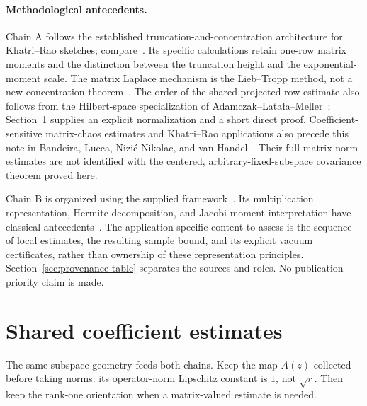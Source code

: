 \documentclass[11pt]{article}
\numberwithin{equation}{section}
\theoremstyle{definition}\newtheorem{definition}[theorem]{Definition}
\theoremstyle{remark}\newtheorem{remark}[theorem]{Remark}
\begin{document}
\paragraph{Methodological antecedents.}
Chain A follows the established truncation-and-concentration architecture for
Khatri--Rao sketches; compare~\cite[Section~2.3]{BM}. Its specific calculations
retain one-row matrix moments and the distinction between the truncation height
and the exponential-moment scale. The matrix Laplace mechanism is the
Lieb--Tropp method, not a new concentration theorem~\cite{Lieb,Tropp}.
The order of the shared projected-row estimate also follows from the Hilbert-space
specialization of Adamczak--Lata\l a--Meller~\cite[Corollary~12]{ALM};
Section~\ref{sec:common} supplies an explicit normalization and a short direct proof.
Coefficient-sensitive matrix-chaos estimates and Khatri--Rao applications also
precede this note in Bandeira, Lucca, Nizi\'c-Nikolac, and
van Handel~\cite{BLNvH}. Their full-matrix norm estimates are not identified with
the centered, arbitrary-fixed-subspace covariance theorem proved here.

Chain B is organized using the supplied framework~\cite{Framework}. Its
multiplication representation, Hermite decomposition, and Jacobi moment
interpretation have classical antecedents~\cite{Wiener,AccardiBozejko,GolubWelsch}.
The application-specific content to assess is the sequence of local estimates,
the resulting sample bound, and its explicit vacuum certificates, rather than
ownership of these representation principles. Section~\ref{sec:provenance-table}
separates the sources and roles. No publication-priority claim is made.

\clearpage
\section{Shared coefficient estimates}\label{sec:common}
\begin{takeaway}
The same subspace geometry feeds both chains. Keep the map $A(z)$ collected before
taking norms: its operator-norm Lipschitz constant is $1$, not $\sqrt r$.
Then keep the rank-one orientation when a matrix-valued estimate is needed.
\end{takeaway}
\end{document}
